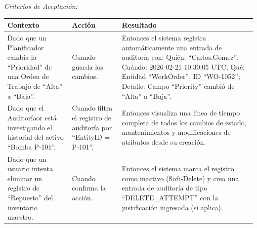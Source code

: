\noindent\textit{Criterios de Aceptación:}
\footnotesize\begin{longtable}{|p{0.28\textwidth}|p{0.32\textwidth}|p{0.34\textwidth}|}\hline
\textbf{Contexto} & \textbf{Acción} & \textbf{Resultado} \\ \hline
\parbox[t]{\linewidth}{Dado que un Planificador cambia la ``Prioridad'' de una Orden de Trabajo de ``Alta'' a ``Baja''.} & \parbox[t]{\linewidth}{Cuando guarda los cambios.} & \parbox[t]{\linewidth}{Entonces el sistema registra automáticamente una entrada de auditoría con: Quién: ``Carlos.Gomez''; Cuándo: 2026-02-21 10:30:05 UTC; Qué: Entidad ``WorkOrder'', ID ``WO-1052''; Detalle: Campo ``Priority'' cambió de ``Alta'' a ``Baja''.} \\ \hline
\parbox[t]{\linewidth}{Dado que el Auditoríaor está investigando el historial del activo ``Bomba P-101''.} & \parbox[t]{\linewidth}{Cuando filtra el registro de auditoría por ``EntityID = P-101''.} & \parbox[t]{\linewidth}{Entonces visualiza una línea de tiempo completa de todos los cambios de estado, mantenimientos y modificaciones de atributos desde su creación.} \\ \hline
\parbox[t]{\linewidth}{Dado que un usuario intenta eliminar un registro de ``Repuesto'' del inventario maestro.} & \parbox[t]{\linewidth}{Cuando confirma la acción.} & \parbox[t]{\linewidth}{Entonces el sistema marca el registro como inactivo (Soft-Delete) y crea una entrada de auditoría de tipo ``DELETE\_ATTEMPT'' con la justificación ingresada (si aplica).} \\ \hline
\end{longtable}\normalsize
\vspace{1em}